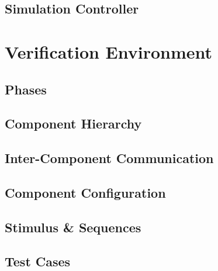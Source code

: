 \documentclass[12pt]{report}
\begin{document}
\subsection{Simulation Controller} %

\section{Verification Environment} %

\subsection{Phases} %

\subsection{Component Hierarchy} %

\subsection{Inter-Component Communication} %

\subsection{Component Configuration} %

\subsection{Stimulus \& Sequences} %

\subsection{Test Cases} %
\end{document}
